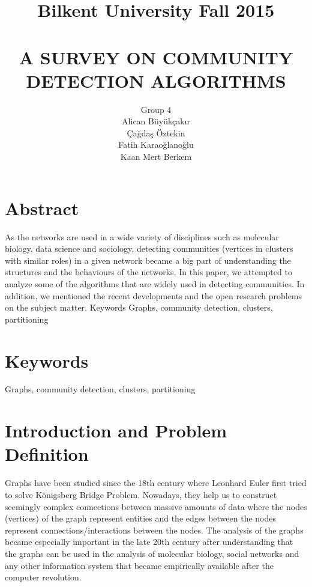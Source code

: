 \documentclass[10pt]{article}
\title{Bilkent University Fall 2015 \\ ~\\
A SURVEY ON COMMUNITY DETECTION ALGORITHMS}
\author{Group 4 \\
Alican Büyükçakır \\ Çağdaş Öztekin \\
Fatih Karaoğlanoğlu \\
Kaan Mert Berkem}
\date{\vspace{-5ex}}
\begin{document}
\maketitle



\section*{Abstract}

As the networks are used in a wide variety of disciplines such as molecular biology, data science and sociology, detecting communities (vertices in clusters with similar roles) in a given network became a big part of understanding the structures and the behaviours of the networks. In this paper, we attempted to analyze some of the algorithms that are widely used in detecting communities. In addition, we mentioned the recent developments and the open research problems on the subject matter.
Keywords
Graphs, community detection, clusters, partitioning

\section*{Keywords}

Graphs, community detection, clusters, partitioning

\newpage

\tableofcontents

\newpage

\section{Introduction and Problem Definition}

Graphs have been studied since the 18th century where Leonhard Euler first tried to solve Königsberg Bridge Problem\cite{euler}. Nowadays, they help us to construct seemingly complex connections between massive amounts of data where the nodes (vertices) of the graph represent entities and the edges between the nodes represent connections/interactions between the nodes. The analysis of the graphs became especially important in the late 20th century after understanding that the graphs can be used in the analysis of molecular biology, social networks and any other information system that became empirically available after the computer revolution.\\
\end{document}
